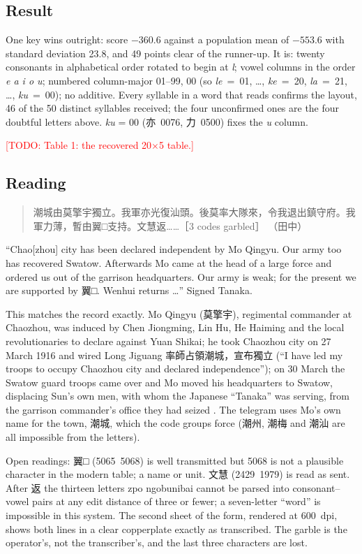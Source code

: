 \documentclass[11pt]{article}
\newcommand{\todo}[1]{\textcolor{red}{[TODO: #1]}}
\newcommand{\ct}[1]{\textsf{#1}}
\begin{document}
\subsection{Result}

One key wins outright: score $-360.6$ against a population mean of $-553.6$ with standard deviation 23.8, and 49 points clear of the runner-up. It is: twenty consonants in alphabetical order rotated to begin at \emph{l}; vowel columns in the order \emph{e a i o u}; numbered column-major 01--99, 00 (so \emph{le}~=~01, \ldots, \emph{ke}~=~20, \emph{la}~=~21, \ldots, \emph{ku}~=~00); no additive. Every syllable in a word that reads confirms the layout, 46 of the 50 distinct syllables received; the four unconfirmed ones are the four doubtful letters above. \emph{ku} = 00 (亦~0076, 力~0500) fixes the \emph{u} column.

\todo{Table 1: the recovered 20$\times$5 table.}

\subsection{Reading}

\begin{quote}
潮城由莫擎宇獨立。我軍亦光復汕頭。後莫率大隊來，令我退出鎮守府。我軍力薄，暫由翼□支持。文慧返……［3 codes garbled］ （田中）
\end{quote}

``Chao[zhou] city has been declared independent by Mo Qingyu. Our army too has recovered Swatow. Afterwards Mo came at the head of a large force and ordered us out of the garrison headquarters. Our army is weak; for the present we are supported by 翼□. Wenhui returns \ldots'' Signed Tanaka.

This matches the record exactly. Mo Qingyu (莫擎宇), regimental commander at Chaozhou, was induced by Chen Jiongming, Lin Hu, He Haiming and the local revolutionaries to declare against Yuan Shikai; he took Chaozhou city on 27 March 1916 and wired Long Jiguang 率師占領潮城，宣布獨立 (``I have led my troops to occupy Chaozhou city and declared independence''); on 30 March the Swatow guard troops came over and Mo moved his headquarters to Swatow, displacing Sun's own men, with whom the Japanese ``Tanaka'' was serving, from the garrison commander's office they had seized \cite{Huang:2017}. The telegram uses Mo's own name for the town, 潮城, which the code groups force (潮州, 潮梅 and 潮汕 are all impossible from the letters).

Open readings: 翼□ (5065~5068) is well transmitted but 5068 is not a plausible character in the modern table; a name or unit. 文慧 (2429~1979) is read as sent. After 返 the thirteen letters \ct{zpo ngobunibai} cannot be parsed into consonant--vowel pairs at any edit distance of three or fewer; a seven-letter ``word'' is impossible in this system. The second sheet of the form, rendered at 600~dpi, shows both lines in a clear copperplate exactly as transcribed. The garble is the operator's, not the transcriber's, and the last three characters are lost.
\end{document}
